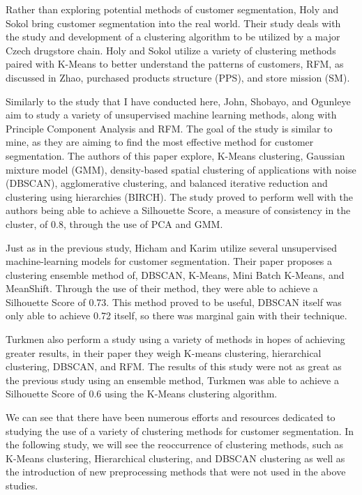 \documentclass[twocolumn]{article}
\begin{document}
Rather than exploring potential methods of customer segmentation, Holy and Sokol bring customer segmentation into the real world. Their study deals with the study and development of a clustering algorithm to be utilized by a major Czech drugstore chain.\cite{sokol} Holy and Sokol utilize a variety of clustering methods paired with K-Means to better understand the patterns of customers, RFM, as discussed in Zhao,\cite{zhao} purchased products structure (PPS), and store mission (SM).

Similarly to the study that I have conducted here, John, Shobayo, and Ogunleye aim to study a variety of unsupervised machine learning methods, along with Principle Component Analysis and RFM.\cite{john} The goal of the study is similar to mine, as they are aiming to find the most effective method for customer segmentation. The authors of this paper explore, K-Means clustering, Gaussian mixture model (GMM), density-based spatial clustering of applications with noise (DBSCAN), agglomerative clustering, and balanced iterative reduction and clustering using hierarchies (BIRCH).\cite{john} The study proved to perform well with the authors being able to achieve a Silhouette Score, a measure of consistency in the cluster, of 0.8, through the use of PCA and GMM.\cite{john}

Just as in the previous study, Hicham and Karim utilize several unsupervised machine-learning models for customer segmentation. Their paper proposes a clustering ensemble method of, DBSCAN, K-Means, Mini Batch K-Means, and MeanShift. Through the use of their method, they were able to achieve a Silhouette Score of 0.73.\cite{hicham} This method proved to be useful, DBSCAN itself was only able to achieve 0.72 itself, so there was marginal gain with their technique.\cite{hicham}

Turkmen also perform a study using a variety of methods in hopes of achieving greater results, in their paper they weigh K-means clustering, hierarchical clustering, DBSCAN, and RFM.\cite{turkmen} The results of this study were not as great as the previous study using an ensemble method, Turkmen was able to achieve a Silhouette Score of 0.6 using the K-Means clustering algorithm.\cite{turkmen} 

We can see that there have been numerous efforts and resources dedicated to studying the use of a variety of clustering methods for customer segmentation. In the following study, we will see the reoccurrence of clustering methods, such as K-Means clustering, Hierarchical clustering, and DBSCAN clustering as well as the introduction of new preprocessing methods that were not used in the above studies.
\end{document}
